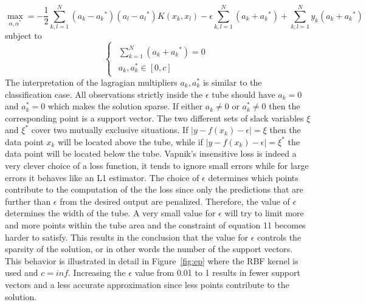 \documentclass[conference,compsoc]{IEEEtran}
\begin{document}
\begin{equation}
\max\limits_{\alpha,\alpha^*} = -\frac{1}{2}\sum_{k,l=1}^{N}(a_k-{a_k}^{*})(a_l-{a_l}^{*})K(x_k,x_l) -\epsilon \sum_{k,l=1}^{N}(a_k+{a_k}^{*}) + \sum_{k,l=1}^{N}y_k (a_k+{a_k}^{*})
\end{equation}
subject to
\begin{equation*}
\begin{cases}
\begin{aligned}
   \sum_{k=1}^{N}(a_k+{a_k}^{*})=0 \\
  a_k,a_k^* \in [0,c]
\end{aligned}
\end{cases}
\end{equation*}
The interpretation of the lagragian multipliers $a_k, a_k^*$ is similar to the classification case. All observations strictly inside the $\epsilon$ tube should have $a_k=0$ and $a_k^*=0$ which makes the solution sparse. If either $a_k \neq 0$ or $a_k^* \neq 0$ then the corresponding point is a support vector. The two different sets of slack variables $\xi$ and $\xi^{*}$ cover two mutually exclusive situations. If $|y-f(x_k)-\epsilon|=\xi$ then the data point $x_k$ will be located above the tube, while if $|y-f(x_k)-\epsilon|=\xi^{*}$ the data point will be located below the tube. Vapnik's insensitive loss is indeed a very clever choice of a loss function, it tends to ignore small errors while for large errors it behaves like an L1 estimator. The choice of $\epsilon$ determines which points contribute to the computation of the the loss since only the predictions that are further than $\epsilon$ from the desired output are penalized. Therefore, the value of $\epsilon$ determines the width of the tube.  A very small value for $\epsilon$ will try to limit more and more points within the tube area and the constraint of equation 11 becomes harder to satisfy. This results in the conclusion that the value for $\epsilon$ controls the sparsity of the solution, or in other words the number of the support vectors. This behavior is illustrated in detail in Figure~\ref{fig:ep} where the RBF kernel is used and $c=inf$.  Increasing the $\epsilon$ value from 0.01 to 1 results in fewer support vectors and a less accurate approximation since less points contribute to the solution. 
\end{document}
